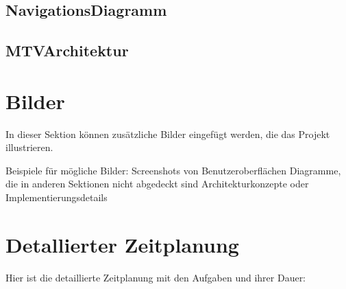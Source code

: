 \documentclass[a4paper,12pt,ngerman]{sphinxmanual}
\begin{document}
\subsection{Navigations\sphinxhyphen{}Diagramm}
\label{\detokenize{sections/diagramme:navigations-diagramm}}\label{\detokenize{sections/diagramme:navigation-diagram}}
\noindent{}


\subsection{MTV\sphinxhyphen{}Architektur}
\label{\detokenize{sections/diagramme:mtv-architektur}}\label{\detokenize{sections/diagramme:mtv-architecture}}
\noindent{}

\sphinxstepscope


\section{Bilder}
\label{\detokenize{sections/bilder:bilder}}\label{\detokenize{sections/bilder::doc}}
\sphinxAtStartPar
In dieser Sektion können zusätzliche Bilder eingefügt werden, die das Projekt illustrieren.

\sphinxAtStartPar
Beispiele für mögliche Bilder:
\sphinxhyphen{} Screenshots von Benutzeroberflächen
\sphinxhyphen{} Diagramme, die in anderen Sektionen nicht abgedeckt sind
\sphinxhyphen{} Architekturkonzepte oder Implementierungsdetails

\sphinxstepscope


\section{Detallierter Zeitplanung}
\label{\detokenize{sections/tables:detallierter-zeitplanung}}\label{\detokenize{sections/tables:detalierter-zeitplanung}}\label{\detokenize{sections/tables::doc}}
\sphinxAtStartPar
Hier ist die detaillierte Zeitplanung mit den Aufgaben und ihrer Dauer:
\end{document}
